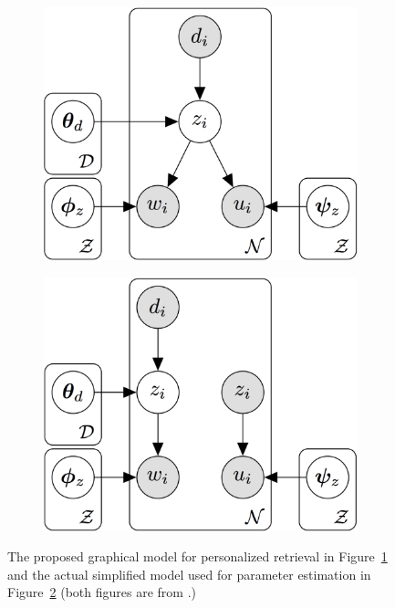 \begin{figure}
  \begin{center}
  \begin{subfigure}{.5\textwidth}
  \centering
  \includegraphics[width=0.8\linewidth]{figures/ptm}
  \caption{}
  \label{fig:ptm-original}
  \end{subfigure}%
  \begin{subfigure}{.5\textwidth}
  \centering
  \includegraphics[width=0.8\linewidth]{figures/ptm-simplified}
  \caption{}
  \label{fig:ptm-simplified}
  \end{subfigure}
  \end{center}
  \caption{The proposed graphical model for personalized retrieval in Figure~\ref{fig:ptm-original} and the actual simplified model used for parameter estimation in Figure~\ref{fig:ptm-simplified} (both figures are from \citet{Harvey-2013}.)}
  \label{fig:ptm}
\end{figure}

